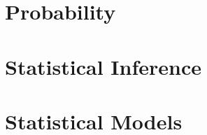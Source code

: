 \documentclass[oneside]{book}
\begin{document}
\pagestyle{fancy}
\renewcommand{\chaptermark}[1]{\markboth{#1}{#1}}
\fancyhead[R]{\thepage}
\fancyhead[L]{\chaptername\ \thechapter\ --\ \leftmark}



\tableofcontents
\part{Probability}





\part{Statistical Inference}





\part{Statistical Models}





\end{document}
